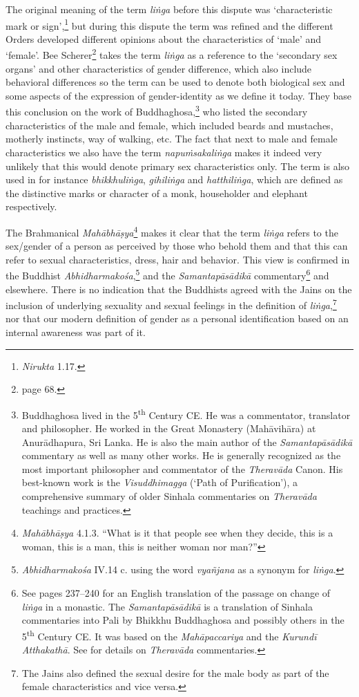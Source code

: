 The original meaning of the term \textit{liṅga} before this dispute was `characteristic mark or sign',\footnote{\textit{Nirukta} 1.17.} but during this dispute the term was refined and the different Orders developed different opinions about the characteristics of `male' and `female'. Bee Scherer\footnote{\cite{scherer} page 68.} takes the term \textit{liṅga} as a reference to the `secondary sex organs' and other characteristics of gender difference, which also include behavioral differences so the term can be used to denote both biological sex and some aspects of the expression of gender-identity as we define it today. They base this conclusion on the work of Buddhaghosa,\footnote{Buddhaghosa lived in the 5\textsuperscript{th} Century CE. He was a commentator, translator and philosopher. He worked in the Great Monastery (Mahāvihāra) at Anurādhapura, Sri Lanka. He is also the main author of the \textit{Samantapāsādikā} commentary as well as many other works. He is generally recognized as the most important philosopher and commentator of the \textit{Theravāda} Canon. His best-known work is the \textit{Visuddhimagga} (`Path of Purification'), a comprehensive summary of older Sinhala commentaries on \textit{Theravāda} teachings and practices.} who listed the secondary characteristics of the male and female, which included beards and mustaches, motherly instincts, way of walking, etc. The fact that next to male and female characteristics we also have the term \textit{napuṁsakaliṅga} makes it indeed very unlikely that this would denote primary sex characteristics only. The term is also used in for instance \textit{bhikkhuliṅga}, \textit{gihiliṅga} and \textit{hatthiliṅga}, which are defined as the distinctive marks or character of a monk, householder and elephant respectively.

The Brahmanical \textit{Mahābhāṣya}\footnote{\textit{Mahābhāṣya} 4.1.3. ``What is it that people see when they decide, this is a woman, this is a man, this is neither woman nor man?''} makes it clear that the term \textit{liṅga} refers to the sex/gender of a person as perceived by those who behold them and that this can refer to sexual characteristics, dress, hair and behavior. This view is confirmed in the Buddhist \textit{Abhidharmakośa},\footnote{\textit{Abhidharmakośa} IV.14 c. using the word \textit{vyañjana} as a synonym for \textit{liṅga}.} and the \textit{Samantapāsādikā} commentary\footnote{See \cite{anderson2016} pages 237–240 for an English translation of the passage on change of \textit{liṅga} in a monastic. The \textit{Samantapāsādikā} is a translation of Sinhala commentaries into Pali by Bhikkhu Buddhaghosa and possibly others in the 5\textsuperscript{th} Century CE. It was based on the \textit{Mahāpaccariya} and the \textit{Kurundī Atthakathā}. See \cite{goonesekere} for details on \textit{Theravāda} commentaries.} and elsewhere. There is no indication that the Buddhists agreed with the Jains on the inclusion of underlying sexuality and sexual feelings in the definition of \textit{liṅga},\footnote{The Jains also defined the sexual desire for the male body as part of the female characteristics and vice versa.} nor that our modern definition of gender as a personal identification based on an internal awareness was part of it.

